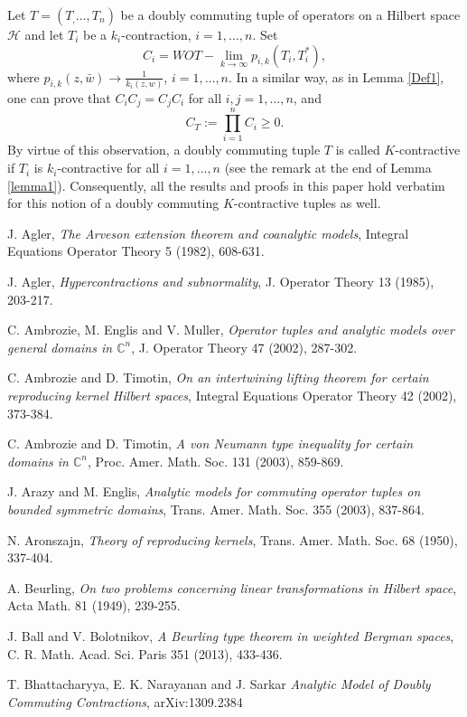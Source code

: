\documentclass[12pt]{amsart}
\begin{document}
Let $T = (T_, \ldots, T_n)$ be a doubly commuting tuple of operators
on a Hilbert space ${\mathcal{H}}$ and let $T_i$ be a $k_i$-contraction, $i =
1, \ldots, n$. Set \[C_i = WOT-\lim_{k {\rightarrow} \infty} p_{i,k}(T_i,
T_i^*),\]where $p_{i,k}(z, \bar{w}) {\rightarrow} \frac{1}{k_i(z, w)}$, $i =
1, \ldots, n$. In a similar way, as in Lemma \ref{Def1}, one can
prove that $C_i C_j = C_j C_i$ for all $i, j = 1, \ldots, n$, and
\[C_T:= \prod_{i=1}^n C_i \geq 0.\] By virtue of this
observation, a doubly commuting tuple $T$ is called $K$-contractive
if $T_i$ is $k_i$-contractive for all $i = 1, \ldots, n$ (see the
remark at the end of Lemma \ref{lemma1}). Consequently, all the
results and proofs in this paper hold verbatim for this notion of a
doubly commuting $K$-contractive tuples as well.

\begin{thebibliography}{99}
J. Agler, {\em The Arveson extension theorem and coanalytic models},
Integral Equations Operator Theory 5 (1982), 608-631.

J. Agler, {\em Hypercontractions and subnormality}, J. Operator
Theory 13 (1985), 203-217.

C. Ambrozie, M. Englis and V. Muller, {\em Operator tuples and
analytic models over general domains in ${\mathbb{C}}^n$}, J. Operator Theory
47 (2002), 287-302.

C. Ambrozie and D. Timotin, {\em On an intertwining lifting theorem
for certain reproducing kernel Hilbert spaces}, Integral Equations
Operator Theory 42 (2002), 373-384.

C. Ambrozie and D. Timotin, {\em A von Neumann type inequality for
certain domains in $\mathbb{C}^n$}, Proc. Amer. Math. Soc. 131
(2003), 859-869.

J. Arazy and M. Englis, {\em Analytic models for commuting operator
tuples on bounded symmetric domains}, Trans. Amer. Math. Soc. 355
(2003), 837-864.

 N. Aronszajn, {\em Theory of reproducing
kernels}, Trans. Amer. Math. Soc. 68 (1950), 337-404.

A. Beurling, {\em On two problems concerning linear transformations
in Hilbert space}, Acta Math. 81 (1949), 239-255.

J. Ball and V. Bolotnikov, {\em A Beurling type theorem in weighted
Bergman spaces}, C. R. Math. Acad. Sci. Paris 351 (2013), 433-436.

T. Bhattacharyya, E. K. Narayanan and J. Sarkar {\em Analytic Model
of Doubly Commuting Contractions}, arXiv:1309.2384


\end{thebibliography}
\end{document}

